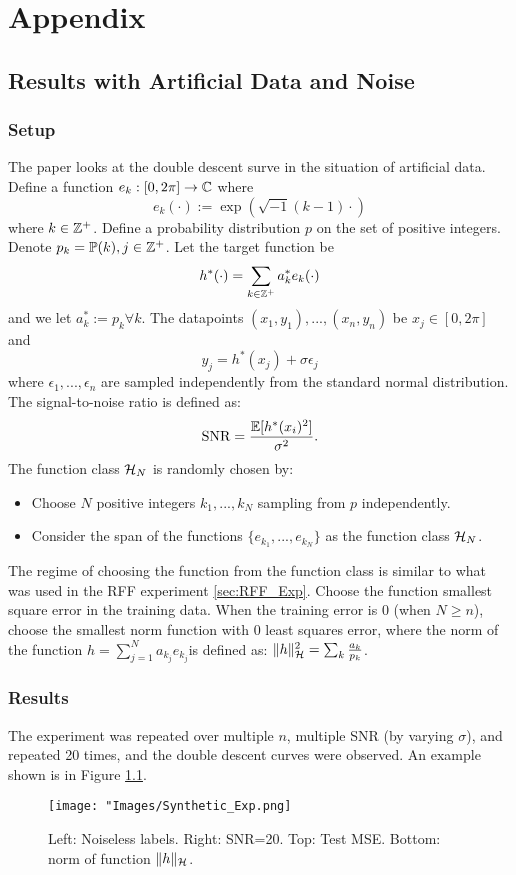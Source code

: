 \documentclass[twoside]{memoir}
\begin{document}
\chapter{Appendix}
\section{Results with Artificial Data and Noise}
\subsection{Setup}
The paper looks at the double descent surve  in the situation of artificial data. Define a function $e_k: [0, 2\pi] \rightarrow \mathbb{C}$ where
\[ e_k(\cdot) := \exp(\sqrt{-1}(k - 1) \cdot) \]
where $k \in \mathbb{Z}^+$. Define a probability distribution $p$ on the set of positive integers. Denote $p_k = \mathbb{P}(k), j \in \mathbb{Z}^+$.
Let the target function be
\[ h^*(\cdot) = \sum_{k \in \mathbb{Z}^+} a^*_k e_k(\cdot)\]
and we let $a_k^* := p_k \forall k$. The datapoints $(x_1, y_1), ..., (x_n, y_n)$ be $x_j \in [0, 2\pi]$ and 
\[ y_j = h^*(x_j) + \sigma\epsilon_j \]
where $\epsilon_1,..., \epsilon_n$ are sampled independently from the standard normal distribution.\\
The signal-to-noise ratio is defined as:
\[ \text{SNR} = \frac{\mathbb{E}[h^*(x_i)^2]}{\sigma^2}. \]
The function class $\mathcal{H}_N$ is randomly chosen by:
\begin{itemize}
	\item Choose $N$ positive integers $k_1,..., k_N$ sampling from $p$ independently.
	\item Consider the span of the functions $\{ e_{k_1},..., e_{k_N} \}$ as the function class $\mathcal{H}_N$.
\end{itemize}
The regime of choosing the function from the function class is similar to what was used in the RFF experiment \ref{sec:RFF_Exp}. Choose the function smallest square error in the training data. When the training error is 0 (when $N \geq n$), choose the smallest norm function with 0 least squares error, where the norm of the function $h = \sum_{j=1}^{N} a_{k_j} e_{k_j} $is defined as: $\lVert h\rVert^2_{\mathcal{H}} = \sum_{k}\frac{a_k}{p_k}$.
\subsection{Results}
The experiment was repeated over multiple $n$, multiple SNR (by varying $\sigma$), and repeated 20 times, and the double descent curves were observed. An example shown is in Figure \ref{fig:Synthetic_Exp}.
\begin{figure}
	\centering
	\texttt{[image: "Images/Synthetic\_Exp.png]}
	\par
	\caption{Left: Noiseless labels. Right: SNR=20. Top: Test MSE. Bottom: norm of function $\lVert h\rVert_{\mathcal{H}}$.} \label{fig:Synthetic_Exp}
\end{figure}
\end{document}
